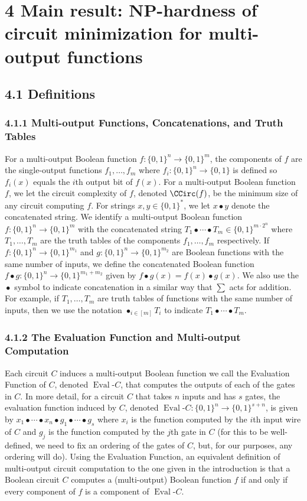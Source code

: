 \section*{4 Main result: NP-hardness of circuit minimization for multi-output functions}
\subsection*{4.1 Definitions}
\subsubsection*{4.1.1 Multi-output Functions, Concatenations, and Truth Tables}
For a multi-output Boolean function $f:\{0,1\}^n\to\{0,1\}^m$, the components of $f$ are the single-output functions $f_1,\ldots,f_m$ where $f_i:\{0,1\}^n\to\{0,1\}$ is defined so $f_i(x)$ equals the $i$th output bit of $f(x)$.
For a multi-output Boolean function $f$, we let the circuit complexity of $f$, denoted $\CCirc(f)$, be the minimum size of any circuit computing $f$.
For strings $x,y\in\{0,1\}^*$, we let $x\bullet y$ denote the concatenated string. We identify a multi-output Boolean function $f:\{0,1\}^n\to\{0,1\}^m$ with the concatenated string $T_1\bullet\cdots\bullet T_m\in\{0,1\}^{m\cdot2^n}$ where $T_1,\ldots,T_m$ are the truth tables of the components $f_1,\ldots,f_m$ respectively.
If $f:\{0,1\}^n\to\{0,1\}^{m_1}$ and $g:\{0,1\}^n\to\{0,1\}^{m_2}$ are Boolean functions with the same number of inputs, we define the concatenated Boolean function $f\bullet g:\{0,1\}^n\to\{0,1\}^{m_1+m_2}$ given by $f\bullet g(x)=f(x)\bullet g(x)$.
We also use the $\mathop{\bullet}$ symbol to indicate concatenation in a similar way that $\sum$ acts for addition. For example, if $T_1,\ldots,T_m$ are truth tables of functions with the same number of inputs, then we use the notation $\mathop{\bullet}_{i\in[m]}T_i$ to indicate $T_1\bullet\cdots\bullet T_m$.
\subsubsection*{4.1.2 The Evaluation Function and Multi-output Computation}
Each circuit $C$ induces a multi-output Boolean function we call the Evaluation Function of $C$, denoted $\operatorname{Eval}\text{-}C$, that computes the outputs of each of the gates in $C$. In more detail, for a circuit $C$ that takes $n$ inputs and has $s$ gates, the evaluation function induced by $C$, denoted $\operatorname{Eval}\text{-}C:\{0,1\}^n\to\{0,1\}^{s+n}$, is given by $x_1\bullet\cdots\bullet x_n\bullet g_1\bullet\cdots\bullet g_s$ where $x_i$ is the function computed by the $i$th input wire of $C$ and $g_j$ is the function computed by the $j$th gate in $C$ (for this to be well-defined, we need to fix an ordering of the gates of $C$, but, for our purposes, any ordering will do).
Using the Evaluation Function, an equivalent definition of multi-output circuit computation to the one given in the introduction is that a Boolean circuit $C$ computes a (multi-output) Boolean function $f$ if and only if every component of $f$ is a component of $\operatorname{Eval}\text{-}C$.
